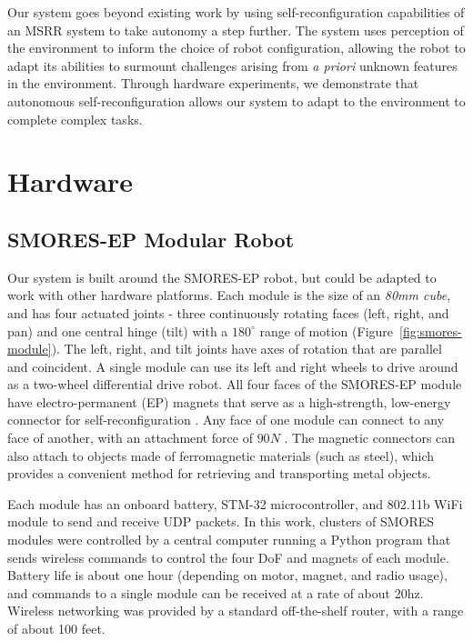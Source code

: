 \documentclass[conference]{IEEEtran}
\begin{document}
Our system goes beyond existing work by using self-reconfiguration capabilities of an MSRR system to take autonomy a step further.  The system uses perception of the environment to inform the choice of robot configuration, allowing the robot to adapt its abilities to surmount challenges arising from \textit{a priori} unknown features in the environment. Through hardware experiments, we demonstrate that autonomous self-reconfiguration allows our system to adapt to the environment to complete complex tasks.

\section{Hardware} %
\label{sec:hardware}
%
\subsection{SMORES-EP Modular Robot} \label{sec:smores}
%
Our system is built around the SMORES-EP robot, but could be adapted to
work with other hardware platforms. Each module is the size of an \textit{80mm cube}, and has four actuated joints - three continuously rotating faces (left, right, and
pan)  and one central hinge (tilt) with a \(180^\circ\) range of motion
(Figure~\ref{fig:smores-module}). The left, right, and tilt joints have
 axes of rotation that are parallel and coincident. A single module can use its
left and right wheels to drive around as a two-wheel differential drive robot.
All four faces of the SMORES-EP module have electro-permanent (EP) magnets
that serve as a high-strength, low-energy connector for self-reconfiguration
\cite{tosun2016design}.  Any face of one module can connect to any face of
another, with an attachment force of $90N$ \cite{tosun2016design}. The magnetic connectors can also attach to objects made of ferromagnetic materials (such as steel), which provides a convenient method for retrieving and transporting metal objects.

Each module has an onboard battery, STM-32 microcontroller, and 802.11b WiFi
module to send and receive UDP packets.  In this work, clusters of SMORES
modules were controlled by a central computer running a Python program that
sends wireless commands to control the four DoF and magnets of each module.
Battery life is about one hour (depending on motor, magnet, and radio usage),
and commands to a single module can be received at a rate of about 20hz.
Wireless networking was provided by a standard off-the-shelf  router, with a
range of about 100 feet.
\end{document}
